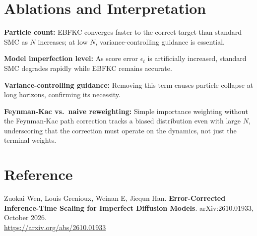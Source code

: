 \documentclass[10pt,twocolumn]{article}
\begin{document}
\section{Ablations and Interpretation}

\textbf{Particle count:} EBFKC converges faster to the correct target than standard
SMC as $N$ increases; at low $N$, variance-controlling guidance is essential.

\textbf{Model imperfection level:} As score error $\epsilon_t$ is artificially
increased, standard SMC degrades rapidly while EBFKC remains accurate.

\textbf{Variance-controlling guidance:} Removing this term causes particle collapse
at long horizons, confirming its necessity.

\textbf{Feynman-Kac vs.\ naive reweighting:} Simple importance weighting without
the Feynman-Kac path correction tracks a biased distribution even with large $N$,
underscoring that the correction must operate on the dynamics, not just the terminal
weights.

\section*{Reference}

Zuokai Wen, Louis Grenioux, Weinan E, Jiequn Han.
\textbf{Error-Corrected Inference-Time Scaling for Imperfect Diffusion Models}.
arXiv:2610.01933, October 2026.\\
\url{https://arxiv.org/abs/2610.01933}
\end{document}

